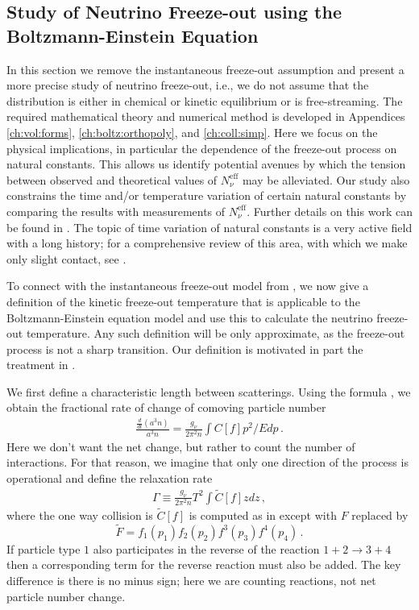 \subsection{Study of Neutrino Freeze-out using  the Boltzmann-Einstein Equation}\label{ch:param:studies}
In this section we remove the instantaneous freeze-out assumption  and present a more precise study of  neutrino freeze-out, i.e., we do not assume that the distribution is either in chemical or kinetic equilibrium or is free-streaming.
The required mathematical theory and numerical method is developed in Appendices \ref{ch:vol:forms}, \ref{ch:boltz:orthopoly}, and \ref{ch:coll:simp}.  Here we focus on the physical implications, in particular the dependence of the freeze-out process on natural constants. This allows us identify potential avenues by which the tension between observed and theoretical values of $N^{\mathrm{eff}}_\nu$ may be alleviated.   Our study also constrains the time and/or temperature variation of certain natural constants by comparing the results with measurements of $N_\nu^{\mathrm{eff}}$. Further details on this work can be found in \cite{Birrell:2014uka}. The topic of time variation of natural constants is a very active field with a long history; for a comprehensive review of this area, with which we make only slight contact,  see \cite{Uzan:2010pm}.  

To connect with the instantaneous freeze-out model from , we now give a definition of the kinetic freeze-out temperature that is applicable to the Boltzmann-Einstein equation model and use this to calculate the neutrino freeze-out temperature. Any such definition will be only approximate, as the freeze-out process is not a sharp transition.  Our definition is motivated in part the treatment in \cite{Kolb:1990vq}. 

We first define a characteristic length between scatterings. Using the formula , we obtain the fractional rate of change of comoving particle number
\begin{align}
\frac{\frac{d}{dt}(a^3 n)}{a^3n}=\frac{g_\nu}{2\pi^2n}\int C[f]p^2/Edp\,.
\end{align}
Here we don't want the net change, but rather to count the number of interactions.  For that reason, we imagine that only one direction of the process is operational and define the relaxation rate
\begin{align}
\Gamma\equiv\frac{g_\nu}{2\pi^2n}T^2\int \tilde C[f]zdz\,,
\end{align}
where the one way collision is $\tilde C[f]$ is computed as in  except with $F$ replaced by 
\begin{equation}
\tilde F=f_1(p_1)f_2(p_2)f^3(p_3)f^4(p_4)\,.
\end{equation}
If particle type $1$ also participates in the reverse of the reaction $1+2\rightarrow 3+4$ then a corresponding term for the reverse reaction must also be added.  The key difference is there is no minus sign; here we are counting reactions, not net particle number change.

